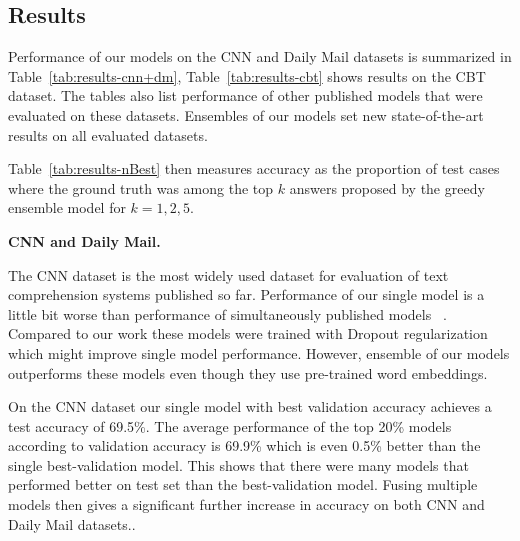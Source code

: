\documentclass[11pt]{article}
\newcommand{\RUDA}[1]{{\color{black}#1}}
\newcommand{\RUDAA}[1]{{\color{black}#1}}
\begin{document}
\subsection{Results}

\RUDA{
Performance of our models on the CNN and Daily Mail datasets is summarized in Table~\ref{tab:results-cnn+dm}, Table~\ref{tab:results-cbt} shows results on the CBT dataset.
The tables also list performance of other published models that were evaluated on these datasets. 
}
Ensembles of our models set new state-of-the-art results on all evaluated datasets. 


Table~\ref{tab:results-nBest} then measures accuracy as the proportion of test cases where the ground truth was among the top $k$ answers proposed by the greedy ensemble model for $k=1,2,5$.


\textbf{CNN and Daily Mail.} 
\RUDAA{The CNN dataset is the most widely used dataset for evaluation of text comprehension systems published so far. Performance of our single model is a little bit worse than performance of simultaneously published models ~\cite{chen2016thorough,Kobayashi2016}. Compared to our work these models were trained with Dropout regularization~\cite{Srivastava2014} which might improve single model performance. However, ensemble of our models outperforms these models even though they use pre-trained word embeddings.


}

On the CNN dataset our single model with best validation accuracy achieves a test accuracy of 69.5\%. The average performance of the top 20\% models according to validation accuracy is 69.9\% which is even 0.5\% better than the single best-validation model. This shows that there were many models that performed better on test set than the best-validation model. Fusing multiple models then gives a significant further increase in accuracy on both CNN and Daily Mail datasets..%
\end{document}
